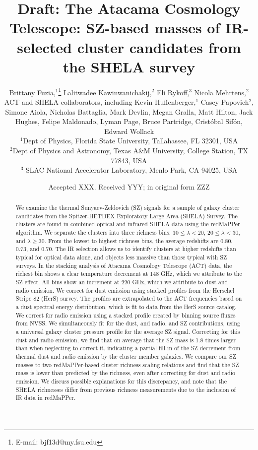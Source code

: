 \documentclass[a4paper,fleqn,usenatbib]{mnras}
\title[SZ effect in SHELA cluster candidates]{Draft: The Atacama Cosmology Telescope: SZ-based masses of IR-selected cluster candidates from the SHELA survey}
\author[B. Fuzia et al.]{
Brittany Fuzia,$^{1}$\thanks{E-mail: bjf13d@my.fsu.edu}
Lalitwadee Kawinwanichakij,$^{2}$
Eli Rykoff,$^{3}$
Nicola Mehrtens,$^{2}$
\newauthor ACT and SHELA collaborators, 
including
Kevin Huffenberger,$^1$ 
Casey Papovich$^{2}$, 
\newauthor Simone Aiola, Nicholas Battaglia, Mark Devlin, Megan Gralla, Matt Hilton, Jack Hughes,  
\newauthor Felipe Maldonado, Lyman Page, Bruce Partridge, Crist\'obal Sif\'on, Edward Wollack
\\
$^{1}$Dept of Physics, Florida State University, Tallahassee, FL 32301, USA\\
$^{2}$Dept of Physics and Astronomy, Texas A\&M University, College Station, TX 77843, USA\\
$^{3}$ SLAC National Accelerator Laboratory, Menlo Park, CA 94025, USA\\
}
\date{Accepted XXX. Received YYY; in original form ZZZ}
\begin{document}
\label{firstpage}
\pagerange{\pageref{firstpage}--\pageref{lastpage}}
\maketitle

\begin{abstract}
We examine the thermal Sunyaev-Zeldovich (SZ) signals for a sample of galaxy cluster candidates from the Spitzer-HETDEX Exploratory Large Area (SHELA) Survey. 
The clusters are found in combined optical and infrared SHELA data using the redMaPPer algorithm. 
We separate the clusters into three richness bins: $10 \leq \lambda < 20$, $20 \leq \lambda < 30$, and $\lambda \geq 30$.
From the lowest to highest richness bins, the average redshifts are 0.80, 0.73, and 0.70. 
The IR selection allows us to identify clusters at higher redshifts than typical for optical data alone, and objects less massive than those typical with SZ surveys. 
In the stacking analysis of Atacama Cosmology Telescope (ACT) data, the richest bin shows a clear temperature decrement at 148 GHz, which we attribute to the SZ effect.  All bins show an increment at 220 GHz, which we attribute to dust and radio emission. 
We correct for dust emission using stacked profiles from the Herschel Stripe 82 (HerS) survey. 
The profiles are extrapolated to the ACT frequencies based on a dust spectral energy distribution, which is fit to data from the HerS source catalog.
We correct for radio emission using a stacked profile created by binning source fluxes from NVSS.
We simultaneously fit for the dust, and radio, and SZ contributions, using a universal galaxy cluster pressure profile for the average SZ signal.
Correcting for this dust and radio emission, we find that on average that the SZ mass is 1.8 times larger than when neglecting to correct it, indicating a partial fill-in of the SZ decrement from thermal dust and radio emission by the cluster member galaxies. 
We compare our SZ masses to two redMaPPer-based cluster richness scaling relations and find that the SZ mass is lower than predicted by the richness, even after correcting for dust and radio emission. 
We discuss possible explanations for this discrepancy, and note that the SHELA richnesses differ from previous richness measurements due to the inclusion of IR data in redMaPPer.


\end{abstract}
\end{document}
